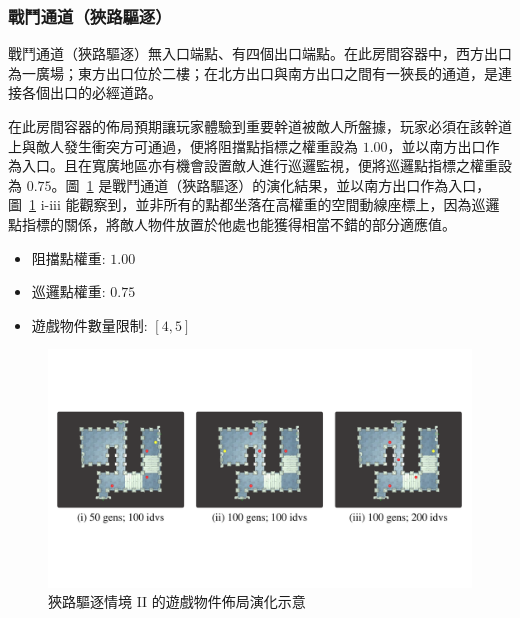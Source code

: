\subsubsection{戰鬥通道（狹路驅逐）}
\label{sssec:method-segments-appliedonvolumes-battlepath-narrow}

戰鬥通道（狹路驅逐）無入口端點、有四個出口端點。在此房間容器中，西方出口為一廣場；東方出口位於二樓；在北方出口與南方出口之間有一狹長的通道，是連接各個出口的必經道路。

在此房間容器的佈局預期讓玩家體驗到重要幹道被敵人所盤據，玩家必須在該幹道上與敵人發生衝突方可通過，便將阻擋點指標之權重設為 $1.00$，並以南方出口作為入口。且在寬廣地區亦有機會設置敵人進行巡邏監視，便將巡邏點指標之權重設為 $0.75$。圖~\ref{fig:applied-ga-on-volume-battlepath-narrow-i} 是戰鬥通道（狹路驅逐）的演化結果，並以南方出口作為入口，圖~\ref{fig:applied-ga-on-volume-battlepath-narrow-i} i-iii 能觀察到，並非所有的點都坐落在高權重的空間動線座標上，因為巡邏點指標的關係，將敵人物件放置於他處也能獲得相當不錯的部分適應值。

\begin{itemize}
  \setlength\itemsep{-0.5em}
  \item 阻擋點權重: $1.00$
  \item 巡邏點權重: $0.75$
  \item 遊戲物件數量限制: $[4, 5]$
\end{itemize}

\begin{figure}[H]
  \begin{center}
    \includegraphics[width=1.0\textwidth]{figures/applied-ga-on-volume-battlepath-narrow-i.pdf}
    \caption{狹路驅逐情境 II 的遊戲物件佈局演化示意} 
    \label{fig:applied-ga-on-volume-battlepath-narrow-i}
  \end{center}
\end{figure}


